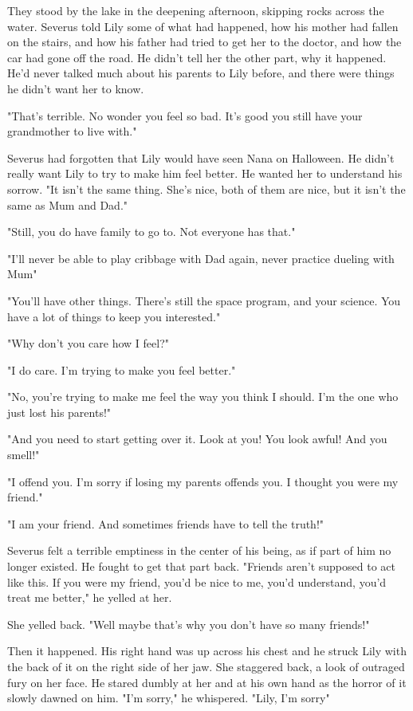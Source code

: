 They stood by the lake in the deepening afternoon, skipping rocks across the water. Severus told Lily some of what had happened, how his mother had fallen on the stairs, and how his father had tried to get her to the doctor, and how the car had gone off the road. He didn't tell her the other part, why it happened. He'd never talked much about his parents to Lily before, and there were things he didn't want her to know.

"That's terrible. No wonder you feel so bad. It's good you still have your grandmother to live with."

Severus had forgotten that Lily would have seen Nana on Halloween. He didn't really want Lily to try to make him feel better. He wanted her to understand his sorrow. "It isn't the same thing. She's nice, both of them are nice, but it isn't the same as Mum and Dad."

"Still, you do have family to go to. Not everyone has that."

"I'll never be able to play cribbage with Dad again, never practice dueling with Mum{\el}"

"You'll have other things. There's still the space program, and your science. You have a lot of things to keep you interested."

"Why don't you care how I feel?"

"I do care. I'm trying to make you feel better."

"No, you're trying to make me feel the way you think I should. I'm the one who just lost his parents!"

"And you need to start getting over it. Look at you! You look awful! And you smell!"

"I offend you. I'm sorry if losing my parents offends you. I thought you were my friend."

"I am your friend. And sometimes friends have to tell the truth!"

Severus felt a terrible emptiness in the center of his being, as if part of him no longer existed. He fought to get that part back. "Friends aren't supposed to act like this. If you were my friend, you'd be nice to me, you'd understand, you'd treat me better," he yelled at her.

She yelled back. "Well maybe that's why you don't have so many friends!"

Then it happened. His right hand was up across his chest and he struck Lily with the back of it on the right side of her jaw. She staggered back, a look of outraged fury on her face. He stared dumbly at her and at his own hand as the horror of it slowly dawned on him. "I'm sorry," he whispered. "Lily, I'm sorry{\el}"


